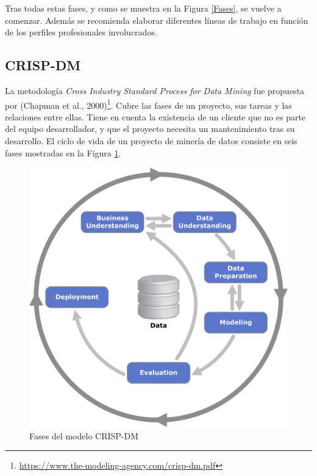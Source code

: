 \documentclass{article}
\begin{document}
Tras todas estas fases, y como se muestra en la Figura \ref{Fases}, se vuelve a comenzar. Además se recomienda elaborar diferentes líneas de trabajo en función de los perfiles profesionales involucrados.


\subsection{CRISP-DM}

La metodología \textit{Cross Industry Standard Process for Data Mining} fue propuesta por (Chapman et al., 2000)\footnote{\url{https://www.the-modeling-agency.com/crisp-dm.pdf}}. Cubre las fases de un proyecto, sus tareas y las relaciones entre ellas. Tiene en cuenta la existencia de un cliente que no es parte del equipo desarrollador, y que el proyecto necesita un mantenimiento tras su desarrollo. El ciclo de vida de un proyecto de minería de datos consiste en seis fases mostradas en la Figura \ref{crispdm}.

\begin{figure}[h]
	\centering
	\includegraphics[scale=0.6]{CRISP-DM}
	\caption{Fases del modelo CRISP-DM}
	\label{crispdm}
\end{figure}
\end{document}
